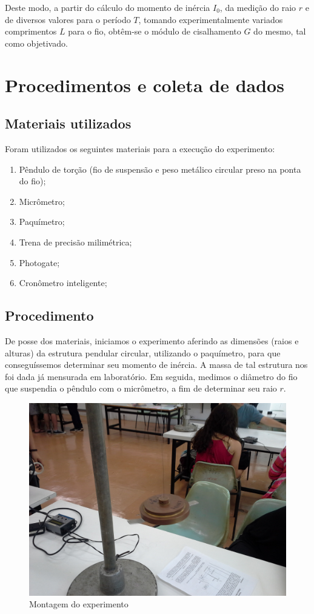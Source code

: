 \documentclass[a4paper]{article}
\begin{document}
Deste modo, a partir do cálculo do momento de inércia $I_0$, da medição do raio $r$ e de diversos valores para o período $T$, tomando experimentalmente variados comprimentos $L$ para o fio, obtêm-se o módulo de cisalhamento $G$ do mesmo, tal como objetivado.

\section{Procedimentos e coleta de dados}
\subsection{Materiais utilizados}
Foram utilizados os seguintes materiais para a execução do experimento:

\begin{enumerate} 
	\item Pêndulo de torção (fio de suspensão e peso metálico circular preso na ponta do fio);
	\item Micrômetro;
	\item Paquímetro;
	\item Trena de precisão milimétrica;
	\item Photogate;
	\item Cronômetro inteligente;
 \end {enumerate} 
 
 \subsection{Procedimento}
De posse dos materiais, iniciamos o experimento aferindo as dimensões (raios e alturas) da estrutura pendular circular, utilizando o paquímetro, para que conseguíssemos determinar seu momento de inércia. A massa de tal estrutura nos foi dada já mensurada em laboratório. Em seguida, medimos o diâmetro do fio que suspendia o pêndulo com o micrômetro, a fim de determinar seu raio $r$.

\begin{figure}[!htbp]
	\centering
	\includegraphics[scale=0.1]{1.jpg}
	\caption{Montagem do experimento}
	\label{fig:cilindro}
\end{figure}
\end{document}
